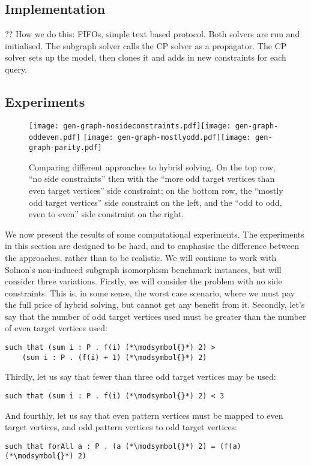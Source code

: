 \documentclass[runningheads]{llncs}
\begin{document}
\subsection{Implementation}

?? How we do this: FIFOs, simple text based protocol. Both solvers are run and initialised. The
subgraph solver calls the CP solver as a propagator. The CP solver sets up the model, then clones it
and adds in new constraints for each query.

\subsection{Experiments}

\begin{figure}[p]
    \texttt{[image: gen-graph-nosideconstraints.pdf]}\hfill\texttt{[image: gen-graph-oddeven.pdf]}
    \medskip
    \texttt{[image: gen-graph-mostlyodd.pdf]}\hfill\texttt{[image: gen-graph-parity.pdf]}
    \caption{Comparing different approaches to hybrid solving. On the top row, ``no side
    constraints'' then with the ``more odd target vertices than even target vertices'' side
    constraint; on the bottom row, the ``mostly odd target vertices'' side constraint on the left,
    and the ``odd to odd, even to even'' side constraint on the right.}\label{figure:cumulative}
\end{figure}

We now present the results of some computational experiments. The experiments in this section are
designed to be hard, and to emphasise the difference between the approaches, rather than to be
realistic. We will continue to work with Solnon's non-induced subgraph isomorphism benchmark
instances, but will consider three variations. Firstly, we will consider the problem with no side
constraints. This is, in some sense, the worst case scenario, where we must pay the full price of
hybrid solving, but cannot get any benefit from it. Secondly, let's say that the number of odd
target vertices used must be greater than the number of even target vertices used:
\newcommand{\modsymbol}{\%}
\begin{lstlisting}
such that (sum i : P . f(i) (*\modsymbol{}*) 2) >
    (sum i : P . (f(i) + 1) (*\modsymbol{}*) 2)
\end{lstlisting}
Thirdly, let us say that fewer than three odd target vertices may be used:
\begin{lstlisting}
such that (sum i : P . f(i) (*\modsymbol{}*) 2) < 3
\end{lstlisting}
And fourthly, let us say that even pattern vertices must be mapped to even target vertices, and odd
pattern vertices to odd target vertices:
\begin{lstlisting}
such that forAll a : P . (a (*\modsymbol{}*) 2) = (f(a) (*\modsymbol{}*) 2)
\end{lstlisting}
\end{document}
